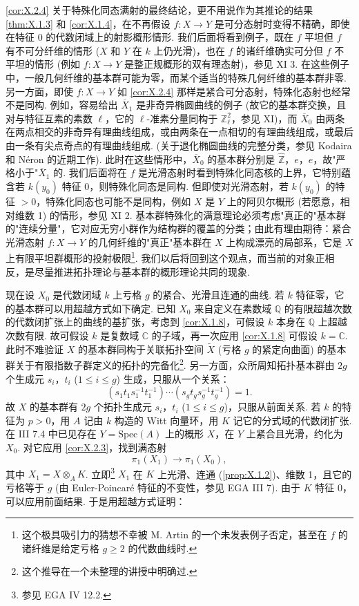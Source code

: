 \begin{remark}\label{rem:X.2.5}
\ref{cor:X.2.4} 关于特殊化同态满射的最终结论，更不用说作为其推论的结果 \ref{thm:X.1.3} 和 \ref{cor:X.1.4}，在不再假设 $f \colon X \to Y$ 是可分态射时变得不精确，即使在特征 0 的代数闭域上的射影概形情形. 我们后面将看到例子，既在 $f$ 平坦但 $f$ 有不可分纤维的情形 ($X$ 和 $Y$ 在 $k$ 上仍光滑)，也在 $f$ 的诸纤维确实可分但 $f$ 不平坦的情形 (例如 $f \colon X \to Y$ 是整正规概形的双有理态射)，参见 XI 3. 在这些例子中，一般几何纤维的基本群可能为零，而某个适当的特殊几何纤维的基本群非零. 另一方面，即使 $f \colon X \to Y$ 如 \ref{cor:X.2.4} 那样是紧合可分态射，特殊化态射也经常不是同构. 例如，容易给出 $\overline{X}_1$ 是非奇异椭圆曲线的例子 (故它的基本群交换，且对与特征互素的素数 $\ell$，它的 $\ell$-准素分量同构于 $\mathbb{Z}_\ell^2$，参见 XI)，而 $\overline{X}_0$ 由两条在两点相交的非奇异有理曲线组成，或由两条在一点相切的有理曲线组成，或最后由一条有尖点奇点的有理曲线组成. (关于退化椭圆曲线的完整分类，参见 Kodaira \cite{exp10-1} 和 Néron 的近期工作). 此时在这些情形中，$\overline{X}_0$ 的基本群分别是 $\widehat{\mathbb{Z}}$，$e$，$e$，故"严格小于"$\overline{X}_1$ 的. 我们后面将在 $f$ 是光滑态射时看到特殊化同态核的上界，它特别蕴含若 $k(y_0)$ 特征 0，则特殊化同态是同构. 但即使对光滑态射，若 $k(y_0)$ 的特征 $> 0$，特殊化同态也可能不是同构，例如 $X$ 是 $Y$ 上的阿贝尔概形 (若愿意，相对维数 1) 的情形，参见 XI 2. 基本群特殊化的满意理论必须考虑"真正的"基本群的"连续分量"，它对应无穷小群作为结构群的覆盖的分类；由此有理由期待：紧合光滑态射 $f \colon X \to Y$ 的几何纤维的"真正"基本群在 $X$ 上构成漂亮的局部系，它是 $X$ 上有限平坦群概形的投射极限\footnote{这个极具吸引力的猜想不幸被 M. Artin 的一个未发表例子否定，甚至在 $f$ 的诸纤维是给定亏格 $g \geqslant 2$ 的代数曲线时.}. 我们以后将回到这个观点，而当前的对象正相反，是尽量推进拓扑理论与基本群的概形理论共同的现象.
\end{remark}

现在设 $X_0$ 是代数闭域 $k$ 上亏格 $g$ 的紧合、光滑且连通的曲线. 若 $k$ 特征零，它的基本群可以用超越方式如下确定. 已知 $X_0$ 来自定义在素数域 $\mathbb{Q}$ 的有限超越次数的代数闭扩张上的曲线的基扩张，考虑到 \ref{cor:X.1.8}，可假设 $k$ 本身在 $\mathbb{Q}$ 上超越次数有限. 故可假设 $k$ 是复数域 $\mathbb{C}$ 的子域，再一次应用 \ref{cor:X.1.8} 可假设 $k = \mathbb{C}$. 此时不难验证 $X$ 的基本群同构于关联拓扑空间 $\tilde{X}$ (亏格 $g$ 的紧定向曲面) 的基本群关于有限指数子群定义的拓扑的完备化\footnote{这个推导在一个未整理的讲授中明确过.}. 另一方面，众所周知拓扑基本群由 $2g$ 个生成元 $s_i$，$t_i$ ($1 \leqslant i \leqslant g$) 生成，只服从一个关系：
\[
(s_1 t_1 s_1^{-1} t_1^{-1}) \cdots (s_g t_g s_g^{-1} t_g^{-1}) = 1.
\]
故 $X$ 的基本群有 $2g$ 个拓扑生成元 $s_i$，$t_i$ ($1 \leqslant i \leqslant g$)，只服从前面关系. 若 $k$ 的特征为 $p > 0$，用 $A$ 记由 $k$ 构造的 Witt 向量环，用 $K$ 记它的分式域的代数闭扩张. 在 III 7.4 中已见存在 $Y = \mathrm{Spec}(A)$ 上的概形 $X$，在 $Y$ 上紧合且光滑，约化为 $X_0$. 对它应用 \ref{cor:X.2.3}，找到满态射
\[
\pi_1(X_1) \longrightarrow \pi_1(X_0),
\]
其中 $X_1 = X \otimes_A K$. 立即\footnote{参见 EGA IV 12.2.} $X_1$ 在 $K$ 上光滑、连通 (\cref{prop:X.1.2})、维数 1，且它的亏格等于 $g$ (由 Euler-Poincaré 特征的不变性，参见 EGA III 7). 由于 $K$ 特征 0，可以应用前面结果. 于是用超越方式证明：

